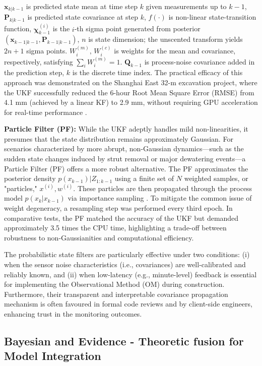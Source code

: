 \documentclass[preprint,11pt,authoryear,3p]{elsarticle}
\begin{document}
$\mathbf{x}_{k|k-1}$ is predicted state mean at time step $k$ given measurements up to $k\!-\!1$, $\mathbf{P}_{k|k-1}$ is predicted state covariance at step $k$, $f(\cdot)$ is non-linear state-transition function, $\boldsymbol{\chi}^{(i)}_{k-1}$ is the $i$-th sigma point generated from posterior $(\mathbf{x}_{k-1|k-1},\mathbf{P}_{k-1|k-1})$, $n$ is state dimension; the unscented transform yields $2n\!+\!1$ sigma points. $W^{(m)}_{i},\,W^{(c)}_{i}$ is weights for the mean and covariance, respectively, satisfying $\sum_{i}W^{(m)}_{i}=1$. $\mathbf{Q}_{k-1}$ is process-noise covariance added in the prediction step, $k$ is the discrete time index. The practical efficacy of this approach was demonstrated on the Shanghai East 32-m excavation project, where the UKF successfully reduced the 6-hour Root Mean Square Error (RMSE) from 4.1 mm (achieved by a linear KF) to 2.9 mm, without requiring GPU acceleration for real-time performance \citep{zhang2021processing}.

\textbf{Particle Filter (PF):} While the UKF adeptly handles mild non-linearities, it presumes that the state distribution remains approximately Gaussian. For scenarios characterized by more abrupt, non-Gaussian dynamics—such as the sudden state changes induced by strut removal or major dewatering events—a Particle Filter (PF) offers a more robust alternative. The PF approximates the posterior density $p(x_{k-1})|Z_{1:k-1}$ using a finite set of $N$ weighted samples, or "particles," $  x^{(i)},w^{(i)}$. These particles are then propagated through the process model $p(x_k|x_{k-1})$ via importance sampling \citep{LIU2024109965}. To mitigate the common issue of weight degeneracy, a resampling step was performed every third epoch. In comparative tests, the PF matched the accuracy of the UKF but demanded approximately 3.5 times the CPU time, highlighting a trade-off between robustness to non-Gaussianities and computational efficiency.

The probabilistic state filters are particularly effective under two conditions: (i) when the sensor noise characteristics (i.e., covariances) are well-calibrated and reliably known, and (ii) when low-latency (e.g., minute-level) feedback is essential for implementing the Observational Method (OM) during construction. Furthermore, their transparent and interpretable covariance propagation mechanism is often favoured in formal code reviews and by client-side engineers, enhancing trust in the monitoring outcomes.

\subsection{Bayesian and Evidence - Theoretic fusion for Model Integration}
\end{document}
